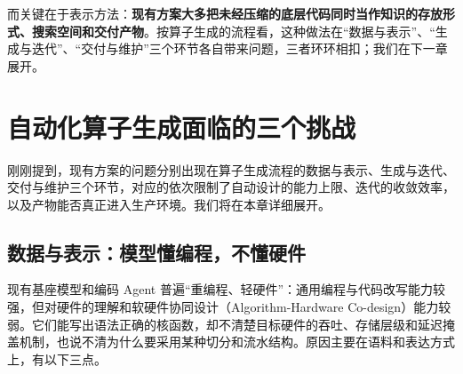 而关键在于表示方法：\textbf{现有方案大多把未经压缩的底层代码同时当作知识的存放形式、搜索空间和交付产物}。按算子生成的流程看，这种做法在“数据与表示”、“生成与迭代”、“交付与维护”三个环节各自带来问题，三者环环相扣；我们在下一章展开。


\SourceSeparator
\clearpage
\section{自动化算子生成面临的三个挑战}\label{sec:challenges}
刚刚提到，现有方案的问题分别出现在算子生成流程的数据与表示、生成与迭代、交付与维护三个环节，对应的依次限制了自动设计的能力上限、迭代的收敛效率，以及产物能否真正进入生产环境。我们将在本章详细展开。


\begin{DiagramBlock}
\end{DiagramBlock}

\newpage

\subsection{数据与表示：模型懂编程，不懂硬件}\label{sec:challenge-data}
现有基座模型和编码 Agent 普遍“重编程、轻硬件”：通用编程与代码改写能力较强，但对硬件的理解和软硬件协同设计（Algorithm-Hardware Co-design）能力较弱。它们能写出语法正确的核函数，却不清楚目标硬件的吞吐、存储层级和延迟掩盖机制，也说不清为什么要采用某种切分和流水结构。原因主要在语料和表达方式上，有以下三点。


